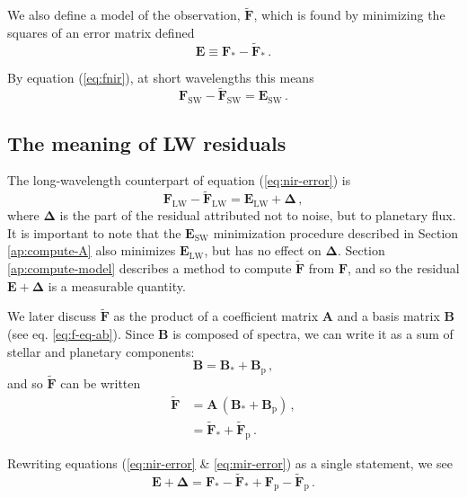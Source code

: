 \documentclass[twocolumn,linenumbers]{aastex7}
\begin{document}
We also define a model of the observation, $\tilde{\mathbf{F}}$, which is found by minimizing the squares of an error matrix defined
\begin{equation}
    \label{eq:def-E}
    \mathbf{E} \equiv \mathbf{F}_* - \tilde{\mathbf{F}}_*\,.
\end{equation}

By equation (\ref{eq:fnir}), at short wavelengths this means
\begin{equation}
    \mathbf{F}_\text{SW} - \tilde{\mathbf{F}}_\text{SW} = \mathbf{E}_\text{SW}\, .
    \label{eq:nir-error}
\end{equation}

\subsection{The meaning of LW residuals}\label{ap:residuals}
The long-wavelength counterpart of equation (\ref{eq:nir-error}) is
\begin{equation}
    \mathbf{F}_\text{LW} - \tilde{\mathbf{F}}_\text{LW} = \mathbf{E}_\text{LW} + \mathbf{\Delta}\, ,
    \label{eq:mir-error}
\end{equation}
where $\mathbf{\Delta}$ is the part of the residual attributed not to noise, but to planetary flux. It is important to note that the $\mathbf{E}_\text{SW}$ minimization procedure described in Section \ref{ap:compute-A} also minimizes $\mathbf{E}_\text{LW}$, but has no effect on $\mathbf{\Delta}$. Section \ref{ap:compute-model} describes a method to compute $\tilde{\mathbf{F}}$ from $\mathbf{F}$, and so the residual $\mathbf{E} + \mathbf{\Delta}$ is a measurable quantity.

We later discuss $\tilde{\mathbf{F}}$ as the product of a coefficient matrix $\mathbf{A}$ and a basis matrix $\mathbf{B}$ (see eq. \ref{eq:f-eq-ab}). Since $\mathbf{B}$ is composed of spectra, we can write it as a sum of stellar and planetary components:
\begin{equation}
    \mathbf{B} = \mathbf{B}_* + \mathbf{B}_\text{p}\, ,
\end{equation}
and so $\tilde{\mathbf{F}}$ can be written
\begin{align}
    \tilde{\mathbf{F}} & = \mathbf{A}\, (\mathbf{B}_* + \mathbf{B}_\text{p})\, , \nonumber \\
    & = \tilde{\mathbf{F}}_* + \tilde{\mathbf{F}}_\text{p}\, .
\end{align}

Rewriting equations (\ref{eq:nir-error} \& \ref{eq:mir-error}) as a single statement, we see
\begin{equation}
    \mathbf{E} + \mathbf{\Delta} = \mathbf{F}_* - \tilde{\mathbf{F}}_* + \mathbf{F}_\text{p} - \tilde{\mathbf{F}}_\text{p}\, .
\end{equation}
\end{document}
